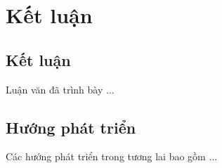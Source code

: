 \chapter{Kết luận}
\label{Chapter5}


\section{Kết luận}

Luận văn đã trình bày $\ldots$

\section{Hướng phát triển}

Các hướng phát triển trong tương lai bao gồm $\ldots$
